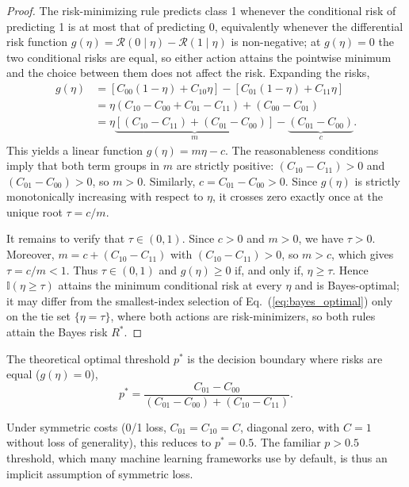 \begin{proof}
The risk-minimizing rule predicts class 1 whenever the conditional risk of predicting 1 is at most that of predicting 0, equivalently whenever the differential risk function $g(\eta) = \mathcal{R}(0 \mid \eta) - \mathcal{R}(1 \mid \eta)$ is non-negative; at $g(\eta) = 0$ the two conditional risks are equal, so either action attains the pointwise minimum and the choice between them does not affect the risk. Expanding the risks,
\begin{align}
    g(\eta) &= [C_{00}(1-\eta) + C_{10}\eta] - [C_{01}(1-\eta) + C_{11}\eta] \\
    &= \eta(C_{10} - C_{00} + C_{01} - C_{11}) + (C_{00} - C_{01}) \\
    &= \eta \underbrace{\left[ (C_{10} - C_{11}) + (C_{01} - C_{00}) \right]}_{m} - \underbrace{(C_{01} - C_{00})}_{c}.
\end{align}
This yields a linear function $g(\eta) = m\eta - c$. The reasonableness conditions imply that both term groups in $m$ are strictly positive: $(C_{10} - C_{11}) > 0$ and $(C_{01} - C_{00}) > 0$, so $m > 0$. Similarly, $c = C_{01} - C_{00} > 0$. Since $g(\eta)$ is strictly monotonically increasing with respect to $\eta$, it crosses zero exactly once at the unique root $\tau = c/m$.

It remains to verify that $\tau \in (0, 1)$. Since $c > 0$ and $m > 0$, we have $\tau > 0$. Moreover, $m = c + (C_{10} - C_{11})$ with $(C_{10} - C_{11}) > 0$, so $m > c$, which gives $\tau = c/m < 1$. Thus $\tau \in (0, 1)$ and $g(\eta) \geq 0$ if, and only if, $\eta \geq \tau$. Hence $\mathbb{I}(\eta \geq \tau)$ attains the minimum conditional risk at every $\eta$ and is Bayes-optimal; it may differ from the smallest-index selection of Eq.~(\ref{eq:bayes_optimal}) only on the tie set $\{\eta = \tau\}$, where both actions are risk-minimizers, so both rules attain the Bayes risk $R^*$.
\end{proof}

The theoretical optimal threshold $p^*$ is the decision boundary where risks are equal ($g(\eta)=0$),
\begin{equation}\label{eq:elkan_threshold}
    p^* = \frac{C_{01} - C_{00}}{(C_{01} - C_{00}) + (C_{10} - C_{11})}.
\end{equation}

Under symmetric costs (0/1 loss, $C_{01}=C_{10}=C$, diagonal zero, with $C=1$ without loss of generality), this reduces to $p^* = 0.5$. The familiar $p > 0.5$ threshold, which many machine learning frameworks use by default, is thus an implicit assumption of symmetric loss.

